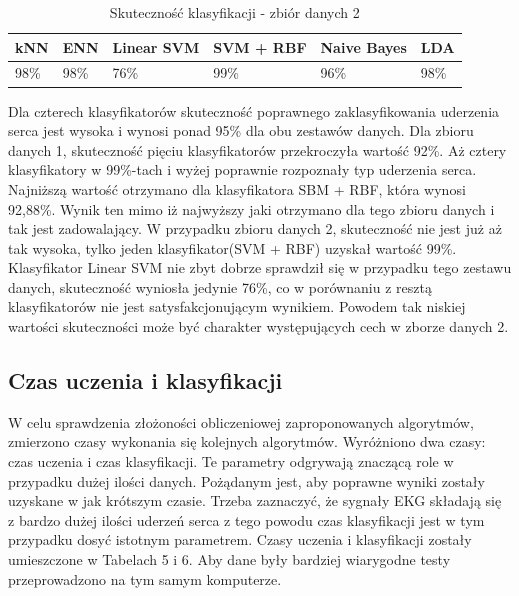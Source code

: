 \documentclass[[10pt,a4paper]{article}
\begin{document}
\begin{table}[h]
\centering
\caption{Skuteczność klasyfikacji - zbiór danych 2}
\label{accuracyTable1}
\begin{tabular}{|l|l|l|l|l|l|}
\hline
kNN & ENN & Linear SVM & SVM + RBF & Naive Bayes & LDA \\ \hline
  98\%   &  98\%  & 76\%       & 99\%      & 96\%         & 98\%  \\ \hline
\end{tabular}
\end{table}

Dla czterech klasyfikatorów skuteczność poprawnego zaklasyfikowania uderzenia serca jest wysoka i wynosi ponad 95\% dla obu zestawów danych. Dla zbioru danych 1,  skuteczność pięciu klasyfikatorów przekroczyła wartość 92\%.  Aż cztery klasyfikatory w 99\%-tach i wyżej poprawnie rozpoznały typ uderzenia serca. Najniższą wartość otrzymano dla klasyfikatora SBM + RBF, która wynosi 92,88\%. Wynik ten mimo iż najwyższy jaki otrzymano dla tego zbioru danych i tak jest zadowalający. W przypadku zbioru danych 2, skuteczność nie jest już aż tak wysoka, tylko jeden klasyfikator(SVM + RBF) uzyskał wartość 99\%. Klasyfikator Linear SVM nie zbyt dobrze sprawdził się w przypadku tego zestawu danych, skuteczność wyniosła jedynie 76\%, co w porównaniu z resztą klasyfikatorów nie jest satysfakcjonującym wynikiem. Powodem tak niskiej wartości skuteczności może być charakter występujących cech w zborze danych 2. 





\subsection{Czas uczenia i klasyfikacji}

W celu sprawdzenia złożoności obliczeniowej zaproponowanych algorytmów, zmierzono czasy wykonania się kolejnych algorytmów. Wyróżniono dwa czasy: czas uczenia i czas klasyfikacji. Te parametry odgrywają znaczącą role w przypadku dużej ilości danych. Pożądanym jest, aby poprawne wyniki zostały uzyskane w jak krótszym czasie. Trzeba zaznaczyć, że sygnały EKG składają się z bardzo dużej ilości uderzeń serca z tego  powodu czas klasyfikacji jest w tym przypadku dosyć istotnym parametrem. Czasy uczenia i klasyfikacji zostały umieszczone w Tabelach 5 i 6. Aby dane były bardziej wiarygodne testy przeprowadzono na tym samym komputerze. 
\end{document}
